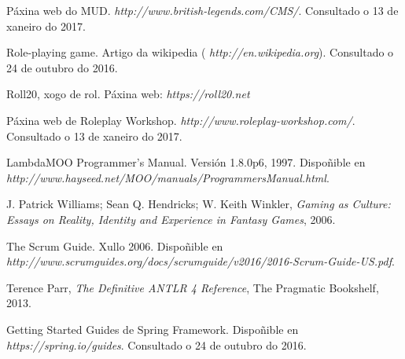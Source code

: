 

\begin{thebibliography}{99}

 Páxina web do MUD. {\it http://www.british-legends.com/CMS/}.
Consultado o 13 de xaneiro do 2017.

 Role-playing game. Artigo da wikipedia ({\it
http://en.wikipedia.org}). Consultado o 24 de outubro do 2016.

 Roll20, xogo de rol. Páxina web: {\it https://roll20.net}

 Páxina web de Roleplay Workshop. {\it
http://www.roleplay-workshop.com/}. Consultado o 13 de xaneiro do 2017.

 LambdaMOO Programmer's Manual. Versión 1.8.0p6, 1997.
Dispoñible en {\it http://www.hayseed.net/MOO/manuals/ProgrammersManual.html}.

 J. Patrick Williams; Sean Q. Hendricks; W. Keith
Winkler, {\it Gaming as Culture: Essays on Reality, Identity and Experience in
Fantasy Games}, 2006.

 The Scrum Guide. Xullo 2006. Dispoñible en {\it
http://www.scrumguides.org/docs/scrumguide/v2016/2016-Scrum-Guide-US.pdf}.

 Terence Parr, {\it The Definitive ANTLR 4 Reference}, The
Pragmatic Bookshelf, 2013.



 Getting Started Guides de Spring Framework. Dispoñible en {\it
https://spring.io/guides}. Consultado o 24 de outubro do 2016.

\end{thebibliography}